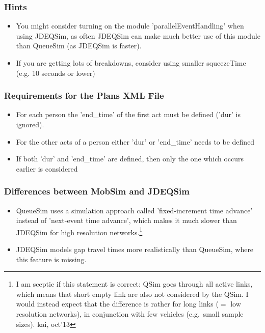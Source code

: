 \subsubsection{Hints}
\begin{itemize}
	\item You might consider turning on the module  'parallelEventHandling' when using JDEQSim, as often JDEQSim can make  much better use of this module than QueueSim (as JDEQSim is faster).
	\item If you are getting lots of breakdowns, consider using smaller squeezeTime (e.g. 10 seconds or lower)
\end{itemize}

\subsubsection{Requirements for the Plans XML File}

\begin{itemize}
	\item For each person the 'end\_time' of the first act must be defined ('dur' is ignored).
	\item For the other acts of a person either 'dur' or 'end\_time' needs to be defined
	\item If both 'dur' and 'end\_time' are defined, then only the one which occurs earlier is considered
\end{itemize}

\subsubsection{Differences between MobSim and JDEQSim}
\begin{itemize}
	\item QueueSim  uses a simulation approach called 'fixed-increment time advance'  instead of 'next-event time advance', which makes it much slower than  JDEQSim for high resolution networks.\footnote{%
%
I am sceptic if this statement is correct: QSim goes through all active links, which means that short empty link are also not considered by the QSim.  I would instead expect that the difference is rather for long links ($=$ low resolution networks), in conjunction with few vehicles (e.g.\ small sample sizes). kai, oct'13
%
}
%
	\item JDEQSim models gap travel times more realistically than QueueSim, where this feature is missing.
\end{itemize}




